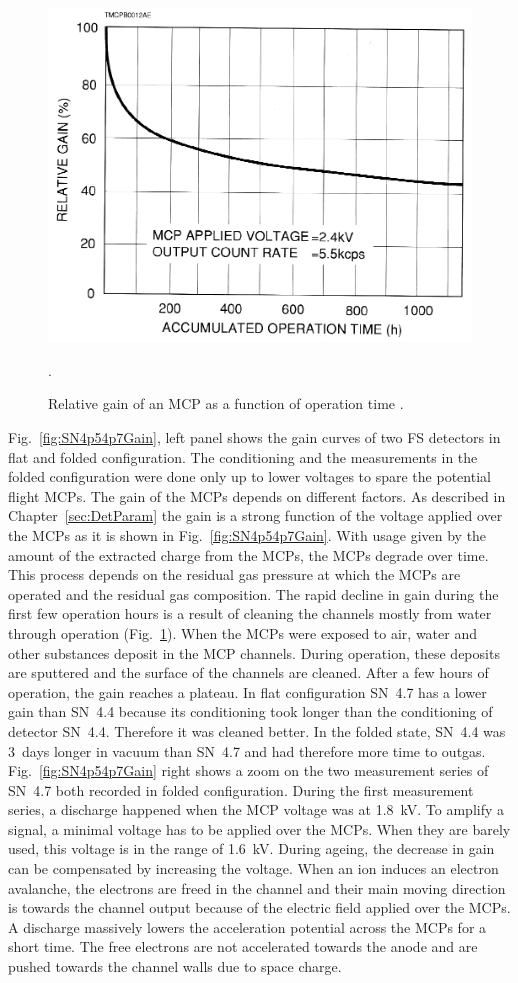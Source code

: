 	\begin{figure}[H] %
		\centering
		\includegraphics[width=.5\textwidth]{Experiments/MCP_relGain_timeevol.png}
		\caption{Relative gain of an MCP as a function of operation time \cite{LecNot_Wurz2017}.}
		\label{fig:MCPrelGainTime}.
	\end{figure}
	Fig.~\ref{fig:SN4p54p7Gain}, left panel shows the gain curves of two FS detectors in flat and folded configuration. The conditioning and the measurements in the folded configuration were done only up to lower voltages to spare the potential flight MCPs. The gain of the MCPs depends on different factors. As described in Chapter~\ref{sec:DetParam} the gain is a strong function of the voltage applied over the MCPs as it is shown in Fig.~\ref{fig:SN4p54p7Gain}. With usage given by the amount of the extracted charge from the MCPs, the MCPs degrade over time. This process depends on the residual gas pressure at which the MCPs are operated and the residual gas composition. The rapid decline in gain during the first few operation hours is a result of cleaning the channels mostly from water through operation (Fig.~\ref{fig:MCPrelGainTime}). When the MCPs were exposed to air, water and other substances deposit in the MCP channels. During operation, these deposits are sputtered and the surface of the channels are cleaned. After a few hours of operation, the gain reaches a plateau. In flat configuration SN~4.7 has a lower gain than SN~4.4 because its conditioning took longer than the conditioning of detector SN~4.4. Therefore it was cleaned better. In the folded state, SN~4.4 was 3~days longer in vacuum than SN~4.7 and had therefore more time to outgas. Fig.~\ref{fig:SN4p54p7Gain} right shows a zoom on the two measurement series of SN~4.7 both recorded in folded configuration. During the first measurement series, a discharge happened when the MCP voltage was at 1.8~kV. To amplify a signal, a minimal voltage has to be applied over the MCPs. When they are barely used, this voltage is in the range of 1.6~kV. During ageing, the decrease in gain can be compensated by increasing the voltage. When an ion induces an electron avalanche, the electrons are freed in the channel and their main moving direction is towards the channel output because of the electric field applied over the MCPs. A discharge massively lowers the acceleration potential across the MCPs for a short time. The free electrons are not accelerated towards the anode and are pushed towards the channel walls due to space charge.
